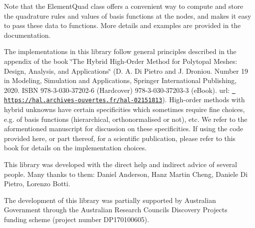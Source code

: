 Note that the {\ttfamily Element\+Quad} class offers a convenient way to compute and store the quadrature rules and values of basis functions at the nodes, and makes it easy to pass these data to functions. More details and examples are provided in the documentation.

The implementations in this library follow general principles described in the appendix of the book \char`\"{}\+The Hybrid High-\/\+Order Method for Polytopal Meshes\+: Design, Analysis, and Applications\char`\"{} (D. A. Di Pietro and J. Droniou. Number 19 in Modeling, Simulation and Applications, Springer International Publishing, 2020. I\+S\+BN 978-\/3-\/030-\/37202-\/6 (Hardcover) 978-\/3-\/030-\/37203-\/3 (e\+Book). url\+: \href{https://hal.archives-ouvertes.fr/hal-02151813}{\texttt{ https\+://hal.\+archives-\/ouvertes.\+fr/hal-\/02151813}}). High-\/order methods with hybrid unknowns have certain specificities which sometimes require fine choices, e.\+g. of basis functions (hierarchical, orthonormalised or not), etc. We refer to the aformentioned manuscript for discussion on these specificities. If using the code provided here, or part thereof, for a scientific publication, please refer to this book for details on the implementation choices.

This library was developed with the direct help and indirect advice of several people. Many thanks to them\+: Daniel Anderson, Hanz Martin Cheng, Daniele Di Pietro, Lorenzo Botti.

The development of this library was partially supported by Australian Government through the Australian Research Council\textquotesingle{}s Discovery Projects funding scheme (project number D\+P170100605). 